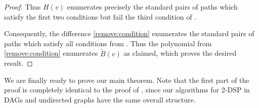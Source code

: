 \documentclass[11pt]{article}
\newcommand{\ca}{\mathcal}
\newcommand{\Frev}{F_{\text{dis}}}
\theoremstyle{definition}
\newtheorem{lemma}[theorem]{Lemma}
\begin{document}
\begin{proof}
    Thus $H(v)$ enumerates precisely the standard pairs of paths which satisfy the first two conditions but fail the third condition of .

    Consequently, the difference \cref{remove:condition} enumerates the standard pairs of paths which satisfy all conditions from .
    Thus the polynomial from \cref{remove:condition}   enumerates $\tilde{B}(v)$ as claimed, which proves the desired result.
\end{proof}



    


We are finally ready to prove our main theorem.
Note that the first part of the proof is completely identical to the proof of , since our algorithms for \textsf{2-DSP} in DAGs and undirected graphs have the same overall structure.
\end{document}
